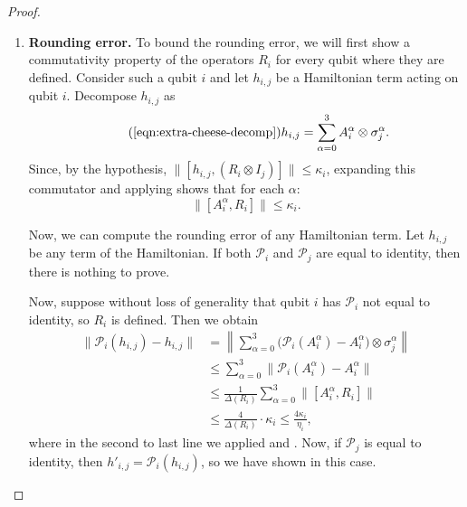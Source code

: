 \documentclass[a4paper,onecolumn,11pt]{quantumarticle}
\theoremstyle{plain}
\renewcommand{\cP}{\mathcal{P}}
\begin{document}
\begin{proof}
\begin{enumerate}
\item \textbf{Rounding error.} To bound the rounding error, we will first show a commutativity property of the operators $R_i$ for every qubit where they are defined. Consider such a qubit $i$ and let $h_{i,j}$ be a Hamiltonian term acting on qubit $i$. Decompose $h_{i,j}$ as
\begin{equation}\tag{\ref{eqn:extra-cheese-decomp}}
    h_{i,j}  = \sum_{\alpha=0}^3 A_i^\alpha \otimes \sigma_j^\alpha. 
\end{equation}
Since, by the hypothesis, $\|[h_{i,j},(R_i \otimes I_j) ]\| \leq \kappa_i$, expanding this commutator and applying  shows that for each $\alpha$:
\begin{equation}
 \| [A_i^\alpha, R_i] \| \leq \kappa_i. \label{eq:R-commutator}
\end{equation}


Now, we can compute the rounding error of any Hamiltonian term. Let $h_{i,j}$ be any term of the Hamiltonian. If both $\cP_i$ and $\cP_j$ are equal to identity, then there is nothing to prove.

Now, suppose without loss of generality that qubit $i$ has $\cP_i$ not equal to identity, so $R_i$ is defined. Then we obtain
\begin{align}
    \| \cP_i(h_{i,j}) - h_{i,j} \| &= \left\|\sum_{\alpha =0}^3 \big(\cP_i(A_i^\alpha)-A_i^\alpha\big)\otimes\sigma_j^\alpha\right\| \\
    &\leq \sum_{\alpha =0}^3 \| \cP_i(A_i^\alpha) - A_i^\alpha\| \\
    &\leq  \frac{1}{\Delta(R_i)} \sum_{\alpha =0}^3 \|[A_i^\alpha, R_i] \| \\
    &\leq \frac{4}{\Delta(R_i)} \cdot \kappa_i \leq \frac{4 \kappa_i}{\eta_i},
 \end{align}
 where in the second to last line we applied  and . Now, if $\cP_j$ is equal to identity, then $h'_{i,j} = \cP_i(h_{i,j})$, so we have shown  in this case.


\end{enumerate}
\end{proof}
\end{document}
